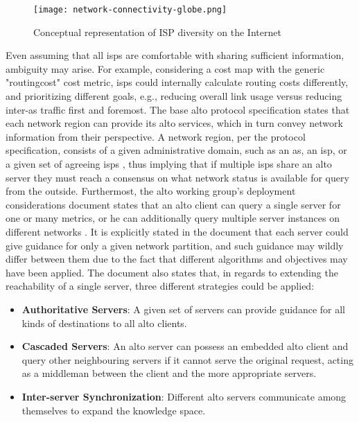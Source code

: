     \begin{figure}[H]
    \centering
    \texttt{[image: network-connectivity-globe.png]}
    \caption{Conceptual representation of ISP diversity on the Internet}
    \label{fig:network-connectivity-globe}
    \end{figure}

    Even assuming that all \glspl{isp} are comfortable with sharing sufficient information, ambiguity may arise.
    For example, considering a cost map with the generic "routingcost" cost metric, \glspl{isp} could internally calculate routing costs differently, and prioritizing different goals, e.g., reducing overall link usage versus reducing inter-\gls{as} traffic first and foremost.
    The base \gls{alto} protocol specification states that each network region can provide its \gls{alto} services, which in turn convey network information from their perspective.
    A network region, per the protocol specification, consists of a given administrative domain, such as an \gls{as}, an \gls{isp}, or a given set of agreeing \glspl{isp} \cite{alto-protocol}, thus implying that if multiple \glspl{isp} share an \gls{alto} server they must reach a consensus on what network status is available for query from the outside.
    Furthermost, the \gls{alto} working group's deployment considerations \cite{alto-deployment-considerations} document states that an \gls{alto} client can query a single server for one or many metrics, or he can additionally query multiple server instances on different networks \cite{alto-deployment-considerations}.
    It is explicitly stated in the document that each server could give guidance for only a given network partition, and such guidance may wildly differ between them due to the fact that different algorithms and objectives may have been applied.
    The document also states that, in regards to extending the reachability of a single server, three different strategies could be applied:

\begin{itemize}
    \item \textbf{Authoritative Servers}: A given set of servers can provide guidance for all kinds of destinations to all \gls{alto} clients.
    \item \textbf{Cascaded Servers}: An \gls{alto} server can possess an embedded \gls{alto} client and query other neighbouring servers if it cannot serve the original request, acting as a middleman between the client and the more appropriate servers.
    \item \textbf{Inter-server Synchronization}: Different \gls{alto} servers communicate among themselves to expand the knowledge space.
\end{itemize}

